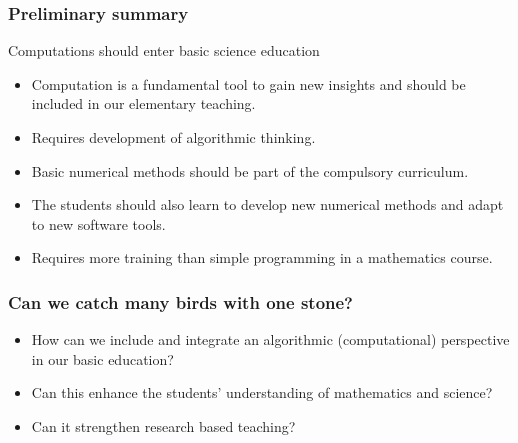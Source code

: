 \documentclass{beamer}
\begin{document}
\begin{frame}
\frametitle{Preliminary summary}

\begin{block}{Computations should enter basic science education }

\begin{itemize}
\item Computation is a fundamental tool to gain new insights and should be included in our elementary teaching.

\item Requires development of algorithmic thinking.

\item Basic numerical methods should be part of the compulsory curriculum.

\item The students should also learn to develop new numerical methods and adapt to new software tools.

\item Requires more training than simple programming in a mathematics course.
\end{itemize}

\noindent
\end{block}
\end{frame}

\begin{frame}
\frametitle{Can we catch many birds with one stone?}

\begin{block}{}
\begin{itemize}
\item How can we include and integrate an algorithmic (computational) perspective   in our basic education?

\item Can this enhance the students' understanding of mathematics and science?

\item Can it strengthen research based teaching?
\end{itemize}

\noindent
\end{block}
\end{frame}
\end{document}
